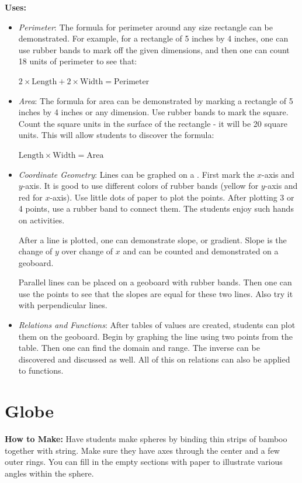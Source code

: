 \noindent\textbf{Uses:}
\begin{itemize}
\item \emph{Perimeter}: The formula for perimeter around any size rectangle can be demonstrated. For example, for a rectangle of 5 inches by 4 inches, one can use rubber bands to mark off the given dimensions, and then one can count 18 units of perimeter to see that:\\
\begin{center}
$2 \times \text{Length} + 2 \times \text{Width} = \text{Perimeter}$
\end{center}
\item \emph{Area}: The formula for area can be demonstrated by marking a rectangle of 5 inches by 4 inches or any dimension. Use rubber bands to mark the square. Count the square units in the surface of the rectangle - it will be 20 square units. This will allow students to discover the formula:\\
\begin{center}
$\text{Length} \times \text{Width} = \text{Area} $
\end{center}
\item \emph{Coordinate Geometry}: Lines can be graphed on a . First mark the $x$-axis and $y$-axis. It is good to use different colors of rubber bands (yellow for $y$-axis and red for $x$-axis). Use little dots of paper to plot the points. After plotting 3 or 4 points, use a rubber band to connect them. The students enjoy such hands on activities.

After a line is plotted, one can demonstrate slope, or gradient. Slope is the change of $y$ over change of $x$ and can be counted and demonstrated on a geoboard.

Parallel lines can be placed on a geoboard with rubber bands. Then one can use the points to see that the slopes are equal for these two lines. Also try it with perpendicular lines.
\item \emph{Relations and Functions}: After tables of values are created, students can plot them on the geoboard. Begin by graphing the line using two points from the table. Then one can find the domain and range. The inverse can be discovered and discussed as well. All of this on relations can also be applied to functions.
\end{itemize}

\section{Globe} \label{globe}
\textbf{How to Make:} Have students make spheres by binding thin strips of bamboo together with string. Make sure they have axes through the center and a few outer rings. You can fill in the empty sections with paper to illustrate various angles within the sphere.\\

